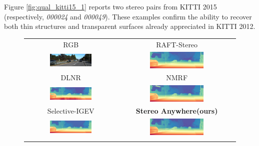 \documentclass[10pt,twocolumn,letterpaper]{article}
\newcommand{\method}[0]{Stereo Anywhere\xspace}
\begin{document}
\clearpage

Figure \ref{fig:qual_kitti15_1} reports two stereo pairs from KITTI 2015 (respectively, \textit{000024} and \textit{000049}). These examples confirm the ability to recover both thin structures and transparent surfaces already appreciated in KITTI 2012.

\begin{figure}[h]
    \centering
    \renewcommand{\tabcolsep}{1pt}
    \begin{tabular}{cc}

        \small RGB &
        \small RAFT-Stereo \cite{lipson2021raft} \\
        \includegraphics[width=0.48\textwidth]{imgs/KITTI/rgb/24.jpg} &
        \includegraphics[width=0.48\textwidth]{imgs/KITTI/stereo/RAFT-Stereo/24.jpg} \\
        \small DLNR \cite{zhao2023high} &
        \small NMRF \cite{guan2024neural} \\
        \includegraphics[width=0.48\textwidth]{imgs/KITTI/stereo/DLNR/24.jpg} &
        \includegraphics[width=0.48\textwidth]{imgs/KITTI/stereo/NMRF/24.jpg} \\
        \small Selective-IGEV \cite{wang2024selective} &
        \textbf{\method (ours)} \\
        \includegraphics[width=0.48\textwidth]{imgs/KITTI/stereo/Selective/24.jpg} &
        \includegraphics[width=0.48\textwidth]{imgs/KITTI/stereo/Ours/24.jpg} \\ \\


\end{tabular}
\end{figure}
\end{document}
